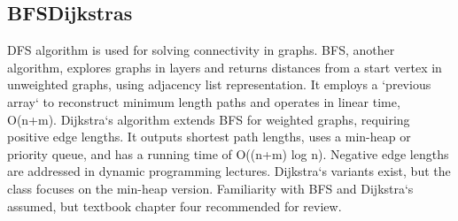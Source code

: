 \subsection*{BFSDijkstras}
DFS algorithm is used for solving connectivity in graphs.
BFS, another algorithm, explores graphs in layers and returns distances from a start vertex in unweighted graphs, using adjacency list representation.
It employs a `previous array` to reconstruct minimum length paths and operates in linear time, O(n+m).
Dijkstra`s algorithm extends BFS for weighted graphs, requiring positive edge lengths.
It outputs shortest path lengths, uses a min-heap or priority queue, and has a running time of O((n+m) log n).
Negative edge lengths are addressed in dynamic programming lectures.
Dijkstra`s variants exist, but the class focuses on the min-heap version.
Familiarity with BFS and Dijkstra`s assumed, but textbook chapter four recommended for review.

